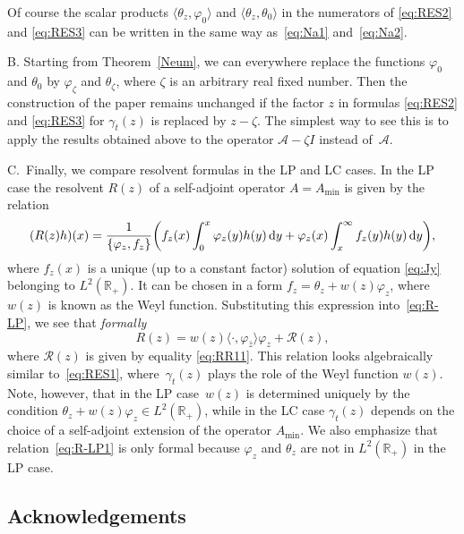 \documentclass[pdftex]{sigma}%
\numberwithin{equation}{section}
\begin{document}
Of course the scalar products $\langle \theta_z, \varphi_{0}\rangle$ and $\langle \theta_z, \theta_{0}\rangle$ in the numerators of \eqref{eq:RES2} and \eqref{eq:RES3} can be written in the same way as~\eqref{eq:Na1} and~\eqref{eq:Na2}.

 B. Starting from Theorem~\ref{Neum}, we can everywhere replace the functions $\varphi_{0}$ and $\theta_{0}$ by $\varphi_{\zeta}$ and $\theta_{\zeta}$, where $\zeta$ is an arbitrary real fixed number. Then the construction of the paper remains unchanged if the factor $z$ in formulas
 \eqref{eq:RES2} and \eqref{eq:RES3} for $\gamma_{t}(z)$ is replaced by $z-\zeta$. The simplest way to see this is to apply the results obtained above to the operator ${\mathcal A}-\zeta I$ instead of~${\mathcal A}$.

 C.~Finally, we compare resolvent formulas in the LP and LC cases. In the LP case the resolvent $R(z)$ of a self-adjoint operator $A= A_{\min}$ is given by the relation
 \begin{equation}
 ( R (z)h) (x) = \frac{1}{\{\varphi_{z}, f_{z}\}} \bigg(f_{z}(x) \int_{0}^x \varphi_{z}(y) h (y) \,{\rm d}y+
 \varphi_{z}(x) \int_x^\infty f_{z}(y) h (y)\,{\rm d}y\bigg),
 \label{eq:R-LP}\end{equation}
 where $f_{z}(x)$ is a unique (up to a constant factor) solution of equation \eqref{eq:Jy} belonging to $L^2 ({\mathbb R}_{+})$. It can be chosen in a form $f_{z}= \theta_{z}+ w(z) \varphi_{z}$, where $w(z)$ is known as the Weyl function. Substituting this expression into~\eqref{eq:R-LP}, we see that {\it formally}
 \begin{equation}
 R (z) = w(z)\langle\cdot, \varphi_{\bar{z}}\rangle \varphi_{z} + {\mathcal R} (z),
 \label{eq:R-LP1}\end{equation}
 where $ {\mathcal R} (z)$ is given by equality \eqref{eq:RR11}. This relation looks algebraically similar to~\eqref{eq:RES1}, where~$\gamma_{t}(z)$ plays the role of the Weyl function $w(z)$. Note, however, that in the LP case~$w(z)$ is determined uniquely by the condition $ \theta_{z}+ w(z) \varphi_{z} \in L^2 ({\mathbb R}_{+})$, while in the LC case
 $\gamma_{t}(z)$ depends on the choice of a self-adjoint extension of the operator $ A_{\min}$. We also emphasize that relation~\eqref{eq:R-LP1} is only formal because $\varphi_{z}$ and $\theta_{z}$ are not in $L^2 ({\mathbb R}_{+})$
 in the LP case.

 \subsection*{Acknowledgements}
\end{document}

